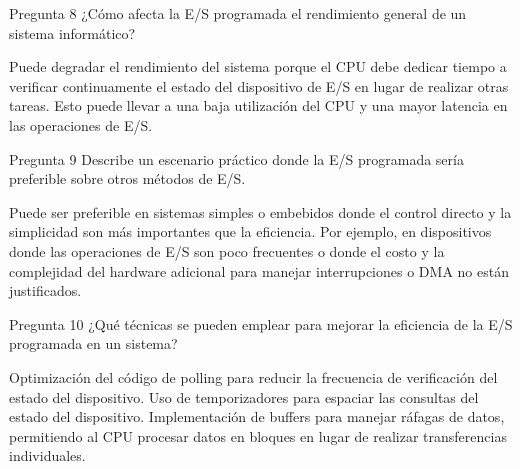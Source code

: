 \documentclass[presentation]{beamer}
\begin{document}
\begin{frame}[label={sec:org9a01568}]{Pregunta 8}
¿Cómo afecta la E/S programada el rendimiento general de un sistema informático?


Puede degradar el rendimiento del sistema porque el CPU debe dedicar tiempo a verificar continuamente el estado del dispositivo de E/S en lugar de realizar otras tareas. Esto puede llevar a una baja utilización del CPU y una mayor latencia en las operaciones de E/S.
\end{frame}

\begin{frame}[label={sec:orgb9ab827}]{Pregunta 9}
Describe un escenario práctico donde la E/S programada sería preferible sobre otros métodos de E/S.


Puede ser preferible en sistemas simples o embebidos donde el control directo y la simplicidad son más importantes que la eficiencia. Por ejemplo, en dispositivos donde las operaciones de E/S son poco frecuentes o donde el costo y la complejidad del hardware adicional para manejar interrupciones o DMA no están justificados.
\end{frame}

\begin{frame}[label={sec:org0f5ad86}]{Pregunta 10}
¿Qué técnicas se pueden emplear para mejorar la eficiencia de la E/S programada en un sistema?


Optimización del código de polling para reducir la frecuencia de verificación del estado del dispositivo.
Uso de temporizadores para espaciar las consultas del estado del dispositivo.
Implementación de buffers para manejar ráfagas de datos, permitiendo al CPU procesar datos en bloques en lugar de realizar transferencias individuales.
\end{frame}
\end{document}

